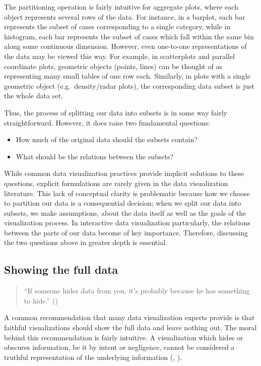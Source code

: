 \documentclass[
  openany]{book}
\providecommand{\tightlist}{%
  \setlength{\itemsep}{0pt}\setlength{\parskip}{0pt}}
\theoremstyle{definition}
\theoremstyle{definition}
\theoremstyle{definition}
\theoremstyle{definition}
\theoremstyle{remark}
\begin{document}
The partitioning operation is fairly intuitive for aggregate plots, where each object represents several rows of the data. For instance, in a barplot, each bar represents the subset of cases corresponding to a single category, while in histogram, each bar represents the subset of cases which fall within the same bin along some continuous dimension. However, even one-to-one representations of the data may be viewed this way. For example, in scatterplots and parallel coordinate plots, geometric objects (points, lines) can be thought of as representing many small tables of one row each. Similarly, in plots with a single geometric object (e.g.~density/radar plots), the corresponding data subset is just the whole data set.

Thus, the process of splitting our data into subsets is in some way fairly straightforward. However, it does raise two fundamental questions:

\begin{itemize}
\tightlist
\item
  How much of the original data should the subsets contain?
\item
  What should be the relations between the subsets?
\end{itemize}

While common data visualization practices provide implicit solutions to these questions, explicit formulations are rarely given in the data visualization literature. This lack of conceptual clarity is problematic because how we choose to partition our data is a consequential decision; when we split our data into subsets, we make assumptions, about the data itself as well as the goals of the visualization process. In interactive data visualization particularly, the relations between the parts of our data become of key importance. Therefore, discussing the two questions above in greater depth is essential.

\subsection{Showing the full data}\label{show-all-data}

\begin{quote}
``If someone hides data from you, it's probably because he has something to hide.'' ()
\end{quote}

A common recommendation that many data visualization experts provide is that faithful visualizations should show the full data and leave nothing out. The moral behind this recommendation is fairly intuitive. A visualization which hides or obscures information, be it by intent or negligence, cannot be considered a truthful representation of the underlying information (, ).
\end{document}

